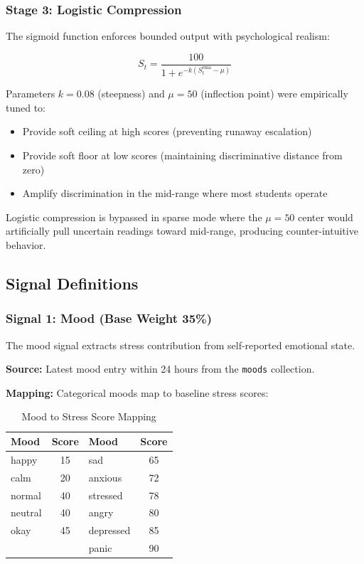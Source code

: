 \documentclass[journal]{IEEEtran}
\begin{document}
\subsubsection{Stage 3: Logistic Compression}

The sigmoid function enforces bounded output with psychological realism:

\begin{equation}
S_t = \frac{100}{1 + e^{-k(S_t^{\text{ema}} - \mu)}}
\end{equation}

Parameters $k = 0.08$ (steepness) and $\mu = 50$ (inflection point) were empirically tuned to:
\begin{itemize}
    \item Provide soft ceiling at high scores (preventing runaway escalation)
    \item Provide soft floor at low scores (maintaining discriminative distance from zero)
    \item Amplify discrimination in the mid-range where most students operate
\end{itemize}

Logistic compression is bypassed in sparse mode where the $\mu=50$ center would artificially pull uncertain readings toward mid-range, producing counter-intuitive behavior.

\subsection{Signal Definitions}

\subsubsection{Signal 1: Mood (Base Weight 35\%)}

The mood signal extracts stress contribution from self-reported emotional state.

\textbf{Source:} Latest mood entry within 24 hours from the \texttt{moods} collection.

\textbf{Mapping:} Categorical moods map to baseline stress scores:

\begin{table}[htbp]
\caption{Mood to Stress Score Mapping}
\centering
\begin{tabular}{lc|lc}
\toprule
\textbf{Mood} & \textbf{Score} & \textbf{Mood} & \textbf{Score} \\
\midrule
happy & 15 & sad & 65 \\
calm & 20 & anxious & 72 \\
normal & 40 & stressed & 78 \\
neutral & 40 & angry & 80 \\
okay & 45 & depressed & 85 \\
 & & panic & 90 \\
\bottomrule
\end{tabular}
\end{table}
\end{document}
